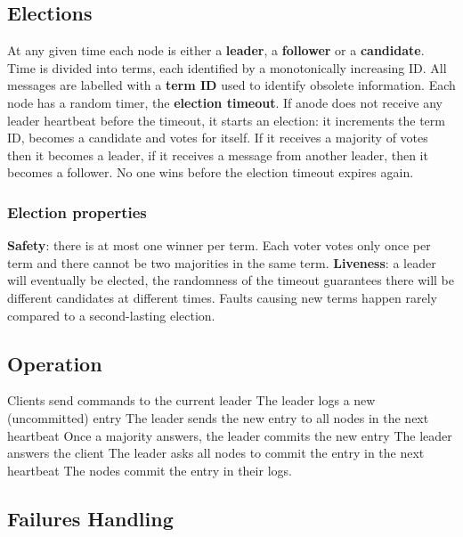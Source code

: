 	\subsection{Elections}
		At any given time each node is either a \textbf{leader}, a \textbf{follower} or a \textbf{candidate}.\newline
		Time is divided into terms, each identified by a monotonically increasing ID. All messages are labelled with a \textbf{term ID} used to identify obsolete information.\newline
		\newline
		Each node has a random timer, the \textbf{election timeout}. If anode does not receive any leader heartbeat before the timeout, it starts an election: it increments the term ID, becomes a candidate and votes for itself.\newline
		If it receives a majority of votes then it becomes a leader, if it receives a message from another leader, then it becomes a follower. No one wins before the election timeout expires again.
		\subsubsection{Election properties}
			\textbf{Safety}: there is at most one winner per term. Each voter votes only once per term and there cannot be two majorities in the same term.\newline
			\textbf{Liveness}: a leader will eventually be elected, the randomness of the timeout guarantees there will be different candidates at different times.\newline
			Faults causing new terms happen rarely compared to a second-lasting election.
	\subsection{Operation}
		Clients send commands to the current leader\newline
		The leader logs a new (uncommitted) entry\newline
		The leader sends the new entry to all nodes in the next heartbeat\newline
		Once a majority answers, the leader commits the new entry\newline
		The leader answers the client\newline
		The leader asks all nodes to commit the entry in the next heartbeat\newline
		The nodes commit the entry in their logs.
	\subsection{Failures Handling}
